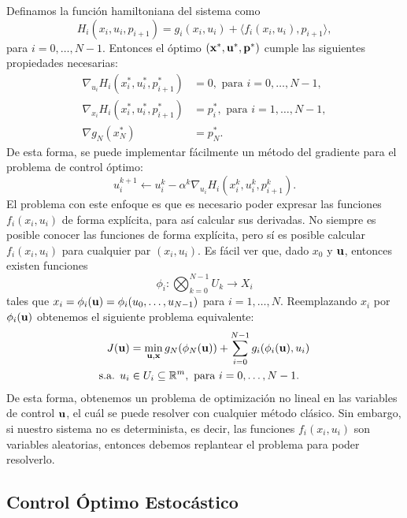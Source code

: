 Definamos la función hamiltoniana del sistema como
\[ H_{i}(x_{i}, u_{i}, p_{i+1}) = g_{i}(x_{i}, u_{i}) + \langle f_{i}(x_{i}, u_{i}), p_{i+1} \rangle,\]
para \(i = 0, \dotsc, N-1\). Entonces el óptimo \((\mathbf{x}^{\ast}, \mathbf{u}^{\ast}, \mathbf{p}^{\ast})\) cumple las siguientes propiedades necesarias:
\begin{align*}
	\nabla_{u_{i}} H_{i}(x_{i}^{\ast}, u_{i}^{\ast}, p_{i+1}^{\ast})	&= 0, \text{ para } i = 0, \dotsc, N-1,\\
	\nabla_{x_{i}} H_{i}(x_{i}^{\ast}, u_{i}^{\ast}, p_{i+1}^{\ast})	&= p_{i}^{\ast}, \text { para } i = 1, \dotsc, N-1,\\
	\nabla g_{N}(x_{N}^{\ast})											&= p_{N}^{\ast}.
\end{align*}
De esta forma, se puede implementar fácilmente un método del gradiente para el problema de control óptimo:
\begin{equation*}
	u_{i}^{k+1} \gets u_{i}^{k} - \alpha^{k} \nabla_{u_{i}} H_{i}(x_{i}^{k}, u_{i}^{k}, p_{i+1}^{k}).
\end{equation*}
El problema con este enfoque es que es necesario poder expresar las funciones \(f_{i}(x_{i}, u_{i})\) de forma explícita, para así calcular sus derivadas. No siempre es posible conocer las funciones de forma explícita, pero sí es posible calcular \(f_{i}(x_{i}, u_{i})\) para cualquier par \((x_{i}, u_{i}).\) Es fácil ver que, dado \(x_{0}\) y \(\mathbf{u}\), entonces existen funciones
\[\phi_{i} : \bigotimes_{k=0}^{N-1} U_{k} \to X_{i}\]
tales que \(x_{i} = \phi_{i}(\mathbf{u}) = \phi_{i}(u_{0}, \dotsc, u_{N-1})\) para \(i = 1, \dotsc, N\). Reemplazando \(x_{i}\) por \(\phi_{i}(\mathbf{u})\) obtenemos el siguiente problema equivalente:
\begin{align*}
	J(\mathbf{u})			&= \min_{\mathbf{u}, \mathbf{x}} g_{N}(\phi_{N}(\mathbf{u})) + \sum_{i=0}^{N-1} g_{i}(\phi_{i}(\mathbf{u}), u_{i}) \\
	\text{s.a. } u_{i}	&\in U_{i} \subseteq \mathbb{R}^{m}, \text{ para } i = 0, \dotsc, N-1.
\end{align*}
De esta forma, obtenemos un problema de optimización no lineal en las variables de control \(\mathbf{u}\), el cuál se puede resolver con cualquier método clásico. Sin embargo, si nuestro sistema no es determinista, es decir, las funciones \(f_{i}(x_{i}, u_{i})\) son variables aleatorias, entonces debemos replantear el problema para poder resolverlo.

\subsection{Control Óptimo Estocástico}


